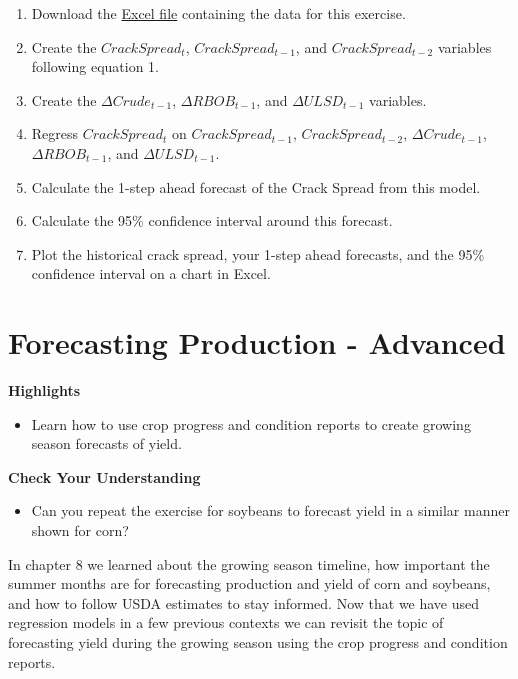 \documentclass[
  letterpaper,
  DIV=11,
  numbers=noendperiod]{scrreprt}
\providecommand{\tightlist}{%
  \setlength{\itemsep}{0pt}\setlength{\parskip}{0pt}}\usepackage{longtable,booktabs,array}
\begin{document}
\begin{enumerate}
\def\labelenumi{\arabic{enumi}.}
\item
  Download the \href{Excel-files/CrackSpread.csv}{Excel file} containing
  the data for this exercise.
\item
  Create the \(CrackSpread_t\), \(CrackSpread_{t-1}\), and
  \(CrackSpread_{t-2}\) variables following equation 1.
\item
  Create the \(\Delta Crude_{t-1}\), \(\Delta RBOB_{t-1}\), and
  \(\Delta ULSD_{t-1}\) variables.
\item
  Regress \(CrackSpread_t\) on \(CrackSpread_{t-1}\),
  \(CrackSpread_{t-2}\), \(\Delta Crude_{t-1}\), \(\Delta RBOB_{t-1}\),
  and \(\Delta ULSD_{t-1}\).
\item
  Calculate the 1-step ahead forecast of the Crack Spread from this
  model.
\item
  Calculate the 95\% confidence interval around this forecast.
\item
  Plot the historical crack spread, your 1-step ahead forecasts, and the
  95\% confidence interval on a chart in Excel.
\end{enumerate}


\chapter{Forecasting Production -
Advanced}\label{forecasting-production---advanced}

\textbf{Highlights}

\begin{itemize}
\tightlist
\item
  Learn how to use crop progress and condition reports to create growing
  season forecasts of yield.
\end{itemize}

\textbf{Check Your Understanding}

\begin{itemize}
\tightlist
\item
  Can you repeat the exercise for soybeans to forecast yield in a
  similar manner shown for corn?
\end{itemize}

In chapter 8 we learned about the growing season timeline, how important
the summer months are for forecasting production and yield of corn and
soybeans, and how to follow USDA estimates to stay informed. Now that we
have used regression models in a few previous contexts we can revisit
the topic of forecasting yield during the growing season using the crop
progress and condition reports.
\end{document}
